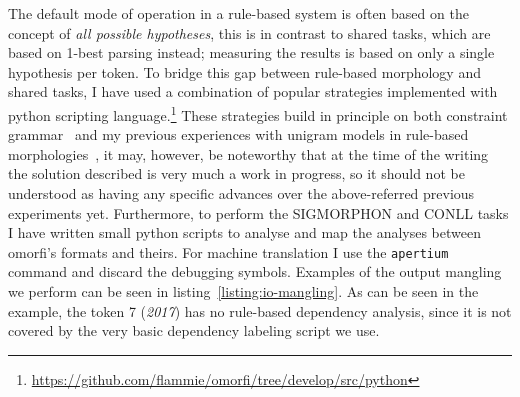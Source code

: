 \documentclass[a4paper,notitlepage]{article}
\begin{document}
The default mode of operation in a rule-based system is often based on the
concept of \textit{all possible hypotheses}, this is in contrast to shared
tasks, which are based on 1-best parsing instead; measuring the results is based
on only a single hypothesis per token. To bridge this gap between rule-based
morphology and shared tasks, I have used a combination of popular strategies
implemented with python scripting
language.\footnote{\url{https://github.com/flammie/omorfi/tree/develop/src/python}}
These strategies build in principle on both constraint
grammar~\citep{karlsson1990constraint,pirinen2015using} and my previous
experiences with unigram models in rule-based
morphologies~\citep{pirinen2009weighting}, it may, however, be noteworthy that
at the time of the writing the solution described is very much a work in
progress, so it should not be understood as having any specific advances over
the above-referred previous experiments yet.  Furthermore, to perform the
SIGMORPHON and CONLL tasks I have written small python scripts to analyse and
map the analyses between omorfi's formats and theirs.  For machine translation I
use the \texttt{apertium} command and discard the debugging symbols. Examples of
the output mangling we perform can be seen in listing~\ref{listing:io-mangling}.
As can be seen in the example, the token 7 (\textit{2017}) has no rule-based
dependency analysis, since it is not covered by the very basic dependency
labeling script we use.
\end{document}
